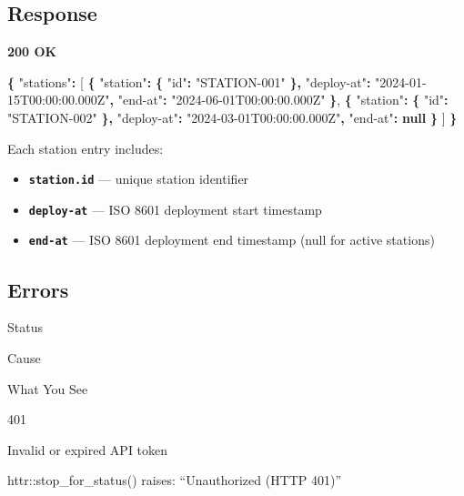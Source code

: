 \documentclass[
]{book}
\newenvironment{Shaded}{\begin{snugshade}}{\end{snugshade}}
\newcommand{\DataTypeTok}[1]{\textcolor[rgb]{0.13,0.29,0.53}{#1}}
\newcommand{\FunctionTok}[1]{\textcolor[rgb]{0.13,0.29,0.53}{\textbf{#1}}}
\newcommand{\KeywordTok}[1]{\textcolor[rgb]{0.13,0.29,0.53}{\textbf{#1}}}
\newcommand{\OtherTok}[1]{\textcolor[rgb]{0.56,0.35,0.01}{#1}}
\newcommand{\StringTok}[1]{\textcolor[rgb]{0.31,0.60,0.02}{#1}}
\providecommand{\tightlist}{%
  \setlength{\itemsep}{0pt}\setlength{\parskip}{0pt}}
\begin{document}
\subsection{Response}\label{response-1}

\textbf{200 OK}

\begin{Shaded}
\begin{Highlighting}[]
\FunctionTok{\{}
  \DataTypeTok{"stations"}\FunctionTok{:} \OtherTok{[}
    \FunctionTok{\{}
      \DataTypeTok{"station"}\FunctionTok{:} \FunctionTok{\{}
        \DataTypeTok{"id"}\FunctionTok{:} \StringTok{"STATION{-}001"}
      \FunctionTok{\},}
      \DataTypeTok{"deploy{-}at"}\FunctionTok{:} \StringTok{"2024{-}01{-}15T00:00:00.000Z"}\FunctionTok{,}
      \DataTypeTok{"end{-}at"}\FunctionTok{:} \StringTok{"2024{-}06{-}01T00:00:00.000Z"}
    \FunctionTok{\}}\OtherTok{,}
    \FunctionTok{\{}
      \DataTypeTok{"station"}\FunctionTok{:} \FunctionTok{\{}
        \DataTypeTok{"id"}\FunctionTok{:} \StringTok{"STATION{-}002"}
      \FunctionTok{\},}
      \DataTypeTok{"deploy{-}at"}\FunctionTok{:} \StringTok{"2024{-}03{-}01T00:00:00.000Z"}\FunctionTok{,}
      \DataTypeTok{"end{-}at"}\FunctionTok{:} \KeywordTok{null}
    \FunctionTok{\}}
  \OtherTok{]}
\FunctionTok{\}}
\end{Highlighting}
\end{Shaded}

Each station entry includes:

\begin{itemize}
\tightlist
\item
  \textbf{\texttt{station.id}} --- unique station identifier
\item
  \textbf{\texttt{deploy-at}} --- ISO 8601 deployment start timestamp
\item
  \textbf{\texttt{end-at}} --- ISO 8601 deployment end timestamp (null for active stations)
\end{itemize}

\subsection{Errors}\label{errors-1}

Status

Cause

What You See

{401}

Invalid or expired API token

httr::stop\_for\_status() raises: ``Unauthorized (HTTP 401)''
\end{document}
